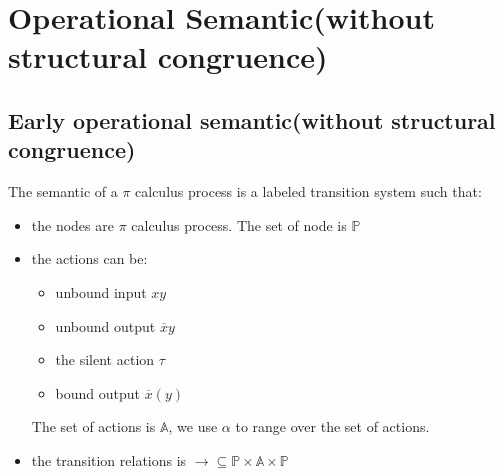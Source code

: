 \begin{definition}
\end{definition}

\section{Operational Semantic(without structural congruence)}
\subsection{Early operational semantic(without structural congruence)}
The semantic of a $\pi$ calculus process is a labeled transition system such that:
\begin{itemize}
  \item 
    the nodes are $\pi$ calculus process. The set of node is $\mathbb{P}$
  \item
    the actions can be:
    \begin{itemize}
      \item unbound input $xy$
      \item unbound output $\overline{x}y$
      \item the silent action $\tau$
      \item bound output $\overline{x}(y)$
    \end{itemize}
    The set of actions is $\mathbb{A}$, we use $\alpha$ to range over the set of actions.
  \item
    the transition relations is $\rightarrow\subseteq \mathbb{P}\times \mathbb{A}\times \mathbb{P}$
\end{itemize}

